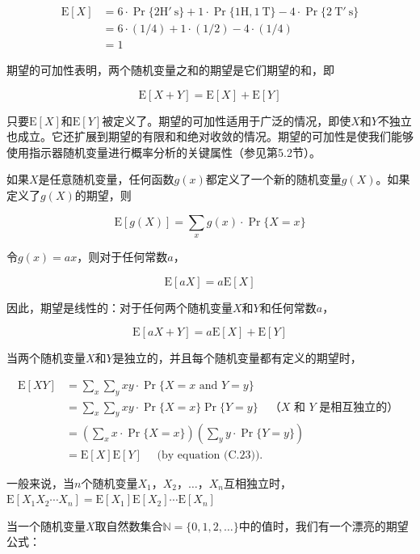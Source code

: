 \documentclass[lang=cn,newtx,10pt,scheme=chinese]{elegantbook}
\begin{document}
$$
\begin{aligned}
\mathrm{E}[X] & =6 \cdot \operatorname{Pr}\{2 \mathrm{H} ' \mathrm{~s}\}+1 \cdot \operatorname{Pr}\{1 \mathrm{H}, 1 \mathrm{~T}\}-4 \cdot \operatorname{Pr}\{2 \mathrm{~T} ' \mathrm{~s}\} \\
& =6 \cdot(1 / 4)+1 \cdot(1 / 2)-4 \cdot(1 / 4) \\
& =1
\end{aligned}
$$

期望的可加性表明，两个随机变量之和的期望是它们期望的和，即

$$
\mathrm{E}[X+Y]=\mathrm{E}[X]+\mathrm{E}[Y]
$$

只要$\mathrm{E}[X]$和$\mathrm{E}[Y]$被定义了。期望的可加性适用于广泛的情况，即使$X$和$Y$不独立也成立。它还扩展到期望的有限和和绝对收敛的情况。期望的可加性是使我们能够使用指示器随机变量进行概率分析的关键属性（参见第5.2节）。

如果$X$是任意随机变量，任何函数$g(x)$都定义了一个新的随机变量$g(X)$。如果定义了$g(X)$的期望，则

$$
\mathrm{E}[g(X)]=\sum_x g(x) \cdot \operatorname{Pr}\{X=x\}
$$

令$g(x)=a x$，则对于任何常数$a$，

$$
\mathrm{E}[a X]=a \mathrm{E}[X]
$$

因此，期望是线性的：对于任何两个随机变量$X$和$Y$和任何常数$a$，

$$
\mathrm{E}[a X+Y]=a \mathrm{E}[X]+\mathrm{E}[Y]
$$

当两个随机变量$X$和$Y$是独立的，并且每个随机变量都有定义的期望时，

$$
\begin{aligned}
\mathrm{E}[X Y] & =\sum_x \sum_y x y \cdot \operatorname{Pr}\{X=x \text { and } Y=y\} \\
& =\sum_x \sum_y x y \cdot \operatorname{Pr}\{X=x\} \operatorname{Pr}\{Y=y\} \quad\text{（}  X \text { 和 } Y \text { 是相互独立的） } \\
& =(\sum_x x \cdot \operatorname{Pr}\{X=x\})(\sum_y y \cdot \operatorname{Pr}\{Y=y\}) \\
& =\mathrm{E}[X] \mathrm{E}[Y] \quad \text { (by equation (C.23)). }
\end{aligned}
$$

一般来说，当$n$个随机变量$X_1，X_2，\ldots，X_n$互相独立时，$\mathrm{E}[X_1 X_2 \cdots X_n]=\mathrm{E}[X_1] \mathrm{E}[X_2] \cdots \mathrm{E}[X_n]$

当一个随机变量$X$取自然数集合$\mathbb{N}=\{0,1,2, \ldots\}$中的值时，我们有一个漂亮的期望公式：
\end{document}
